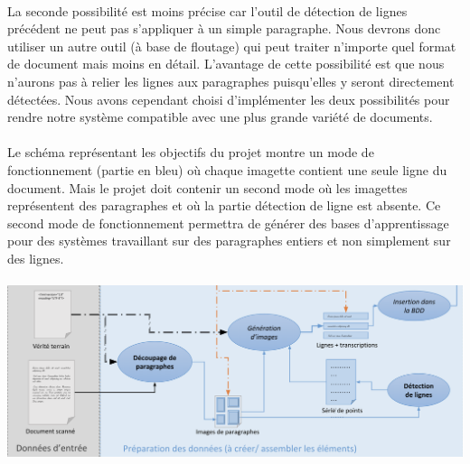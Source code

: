 \paragraph{}
La seconde possibilité est moins précise car l’outil de détection de lignes précédent ne peut pas s’appliquer
à un simple paragraphe. Nous devrons donc utiliser un autre outil (à base de floutage) qui peut traiter n’importe
quel format de document mais moins en détail. L’avantage de cette possibilité est que nous n’aurons pas à relier
les lignes aux paragraphes puisqu’elles y seront directement détectées. Nous avons cependant choisi d’implémenter
les deux possibilités pour rendre notre système compatible avec une plus grande variété de documents.

\paragraph{}
Le schéma représentant les objectifs du projet montre un mode de fonctionnement (partie en bleu) où
chaque imagette contient une seule ligne du document. Mais le projet doit contenir un second mode où
les imagettes représentent des paragraphes et où la partie détection de ligne est absente. Ce second
mode de fonctionnement permettra de générer des bases d’apprentissage pour des systèmes travaillant
sur des paragraphes entiers et non simplement sur des lignes. 

\paragraph{}
\begin{mdframed}[frametitle={Partie traitement des données du projet (avec détection de lignes)}, innerbottommargin=10]
\begin{center}
\includegraphics[width=\linewidth]{detection.png}
\end{center}
\end{mdframed}

